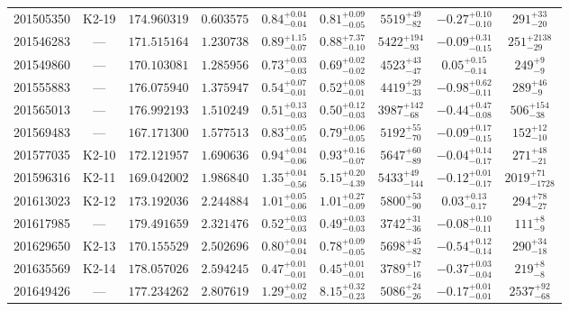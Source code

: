 \begin{landscape}
\begin{table}[hbt!]
\begin{center}
\begin{tabular}{lcccccccc}
 201505350 & K2-19& $174.960319$ & $0.603575$ & $0.84^{+0.04}_{-0.04}$ & $0.81^{+0.09}_{-0.05}$ & $5519^{+  49}_{ -82}$ & $-0.27^{+0.10}_{-0.10}$ & $ 291^{+  33}_{ -20}$ \\ 
 201546283 & ---     & $171.515164$ & $1.230738$ & $0.89^{+1.15}_{-0.07}$ & $0.88^{+7.37}_{-0.10}$ & $5422^{+ 194}_{ -93}$ & $-0.09^{+0.31}_{-0.15}$ & $ 251^{+2138}_{ -29}$ \\ 
 201549860 & ---     & $170.103081$ & $1.285956$ & $0.73^{+0.03}_{-0.03}$ & $0.69^{+0.02}_{-0.02}$ & $4523^{+  43}_{ -47}$ & $0.05^{+0.15}_{-0.14}$ & $ 249^{+   9}_{  -9}$ \\ 
 201555883 & ---     & $176.075940$ & $1.375947$ & $0.54^{+0.07}_{-0.01}$ & $0.52^{+0.08}_{-0.01}$ & $4419^{+  29}_{ -33}$ & $-0.98^{+0.62}_{-0.11}$ & $ 289^{+  46}_{  -9}$ \\ 
 201565013 & ---     & $176.992193$ & $1.510249$ & $0.51^{+0.13}_{-0.03}$ & $0.50^{+0.12}_{-0.03}$ & $3987^{+ 142}_{ -68}$ & $-0.44^{+0.47}_{-0.08}$ & $ 506^{+ 154}_{ -38}$ \\ 
 201569483 & ---     & $167.171300$ & $1.577513$ & $0.83^{+0.05}_{-0.05}$ & $0.79^{+0.06}_{-0.05}$ & $5192^{+  55}_{ -70}$ & $-0.09^{+0.17}_{-0.15}$ & $ 152^{+  12}_{ -10}$ \\ 
 201577035 & K2-10 & $172.121957$ & $1.690636$ & $0.94^{+0.04}_{-0.06}$ & $0.93^{+0.16}_{-0.07}$ & $5647^{+  60}_{ -89}$ & $-0.04^{+0.14}_{-0.17}$ & $ 271^{+  48}_{ -21}$ \\ 
 201596316 & K2-11 & $169.042002$ & $1.986840$ & $1.35^{+0.04}_{-0.56}$ & $5.15^{+0.20}_{-4.39}$ & $5433^{+  49}_{-144}$ & $-0.12^{+0.01}_{-0.17}$ & $2019^{+  71}_{-1728}$ \\ 
 201613023 & K2-12 & $173.192036$ & $2.244884$ & $1.01^{+0.05}_{-0.06}$ & $1.01^{+0.27}_{-0.09}$ & $5800^{+  53}_{ -90}$ & $0.03^{+0.13}_{-0.17}$ & $ 294^{+  78}_{ -27}$ \\ 
 201617985 & ---       & $179.491659$ & $2.321476$ & $0.52^{+0.03}_{-0.03}$ & $0.49^{+0.03}_{-0.03}$ & $3742^{+  31}_{ -36}$ & $-0.08^{+0.10}_{-0.11}$ & $ 111^{+   8}_{  -9}$ \\ 
 201629650 & K2-13 & $170.155529$ & $2.502696$ & $0.80^{+0.04}_{-0.04}$ & $0.78^{+0.09}_{-0.05}$ & $5698^{+  45}_{ -82}$ & $-0.54^{+0.12}_{-0.14}$ & $ 290^{+  34}_{ -18}$ \\ 
 201635569 & K2-14 & $178.057026$ & $2.594245$ & $0.47^{+0.01}_{-0.01}$ & $0.45^{+0.01}_{-0.01}$ & $3789^{+  17}_{ -16}$ & $-0.37^{+0.03}_{-0.04}$ & $ 219^{+   8}_{  -8}$ \\ 
 201649426 & ---       & $177.234262$ & $2.807619$ & $1.29^{+0.02}_{-0.02}$ & $8.15^{+0.32}_{-0.23}$ & $5086^{+  24}_{ -26}$ & $-0.17^{+0.01}_{-0.01}$ & $2537^{+  92}_{ -68}$ \\ 

\end{tabular}
\end{center}
\end{table}
\end{landscape}
